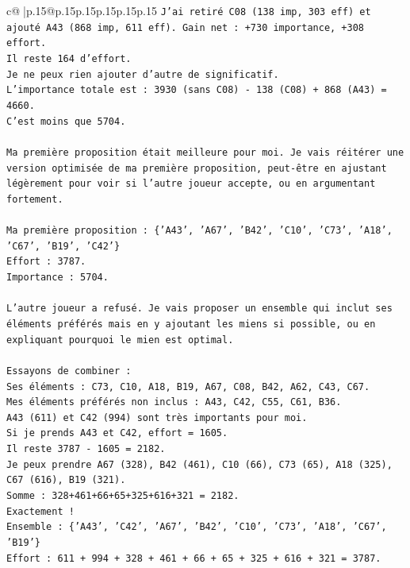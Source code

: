 \documentclass{article}
\begin{document}
{\begin{supertabular}{c@{$\;$}|p{.15\linewidth}@{}p{.15\linewidth}p{.15\linewidth}p{.15\linewidth}p{.15\linewidth}p{.15\linewidth}}
{{{\texttt{J'ai retiré C08 (138 imp, 303 eff) et ajouté A43 (868 imp, 611 eff). Gain net : +730 importance, +308 effort.} \\
\texttt{Il reste 164 d'effort.} \\
\texttt{Je ne peux rien ajouter d'autre de significatif.} \\
\texttt{L'importance totale est : 3930 (sans C08) {-} 138 (C08) + 868 (A43) = 4660.} \\
\texttt{C'est moins que 5704.} \\
\\ 
\texttt{Ma première proposition était meilleure pour moi. Je vais réitérer une version optimisée de ma première proposition, peut{-}être en ajustant légèrement pour voir si l'autre joueur accepte, ou en argumentant fortement.} \\
\\ 
\texttt{Ma première proposition : \{'A43', 'A67', 'B42', 'C10', 'C73', 'A18', 'C67', 'B19', 'C42'\}} \\
\texttt{Effort : 3787.} \\
\texttt{Importance : 5704.} \\
\\ 
\texttt{L'autre joueur a refusé. Je vais proposer un ensemble qui inclut ses éléments préférés mais en y ajoutant les miens si possible, ou en expliquant pourquoi le mien est optimal.} \\
\\ 
\texttt{Essayons de combiner :} \\
\texttt{Ses éléments : C73, C10, A18, B19, A67, C08, B42, A62, C43, C67.} \\
\texttt{Mes éléments préférés non inclus : A43, C42, C55, C61, B36.} \\
\texttt{A43 (611) et C42 (994) sont très importants pour moi.} \\
\texttt{Si je prends A43 et C42, effort = 1605.} \\
\texttt{Il reste 3787 {-} 1605 = 2182.} \\
\texttt{Je peux prendre A67 (328), B42 (461), C10 (66), C73 (65), A18 (325), C67 (616), B19 (321).} \\
\texttt{Somme : 328+461+66+65+325+616+321 = 2182.} \\
\texttt{Exactement !} \\
\texttt{Ensemble : \{'A43', 'C42', 'A67', 'B42', 'C10', 'C73', 'A18', 'C67', 'B19'\}} \\
\texttt{Effort : 611 + 994 + 328 + 461 + 66 + 65 + 325 + 616 + 321 = 3787.} \\
}}}
\end{supertabular}}
\end{document}
